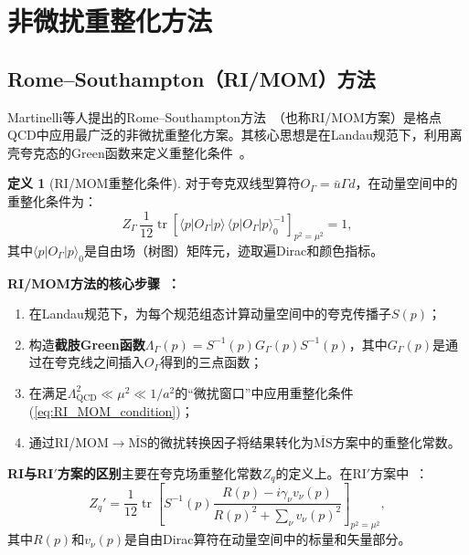 \documentclass[12pt,a4paper]{ctexart}
\theoremstyle{definition}
\newtheorem{definition}{定义}[section]
\begin{document}
\section{非微扰重整化方法}

\subsection{Rome--Southampton（RI/MOM）方法}

Martinelli等人提出的Rome--Southampton方法~\cite{Martinelli1995RI}（也称RI/MOM方案）是格点QCD中应用最广泛的非微扰重整化方案。其核心思想是在Landau规范下，利用离壳夸克态的Green函数来定义重整化条件~\cite{GattringerLang2010}。

\begin{definition}[RI/MOM重整化条件]
对于夸克双线型算符$O_\Gamma = \bar u \Gamma d$，在动量空间中的重整化条件为：
\begin{equation}
Z_\Gamma \, \frac{1}{12} \operatorname{tr}\!\left[ \langle p | O_\Gamma | p \rangle \, \langle p | O_\Gamma | p \rangle_0^{-1} \right]_{p^2 = \mu^2} = 1,
\label{eq:RI_MOM_condition}
\end{equation}
其中$\langle p|O_\Gamma|p\rangle_0$是自由场（树图）矩阵元，迹取遍Dirac和颜色指标。
\end{definition}

\textbf{RI/MOM方法的核心步骤~\cite{GattringerLang2010}：}
\begin{enumerate}[leftmargin=*]
    \item 在Landau规范下，为每个规范组态计算动量空间中的夸克传播子$S(p)$；
    \item 构造\textbf{截肢Green函数}$\Lambda_\Gamma(p) = S^{-1}(p) G_\Gamma(p) S^{-1}(p)$，其中$G_\Gamma(p)$是通过在夸克线之间插入$O_\Gamma$得到的三点函数；
    \item 在满足$\Lambda_{\text{QCD}}^2 \ll \mu^2 \ll 1/a^2$的``微扰窗口''中应用重整化条件(\ref{eq:RI_MOM_condition})；
    \item 通过RI/MOM$\to\overline{\text{MS}}$的微扰转换因子将结果转化为$\overline{\text{MS}}$方案中的重整化常数。
\end{enumerate}

\textbf{RI与RI$'$方案的区别}主要在夸克场重整化常数$Z_q$的定义上。在RI$'$方案中~\cite{GattringerLang2010}：
\begin{equation}
Z_q' = \frac{1}{12} \operatorname{tr}\!\left[ S^{-1}(p) \frac{R(p) - i\gamma_\nu v_\nu(p)}{R(p)^2 + \sum_\nu v_\nu(p)^2} \right]_{p^2=\mu^2},
\label{eq:RIprime_Zq}
\end{equation}
其中$R(p)$和$v_\nu(p)$是自由Dirac算符在动量空间中的标量和矢量部分。
\end{document}
